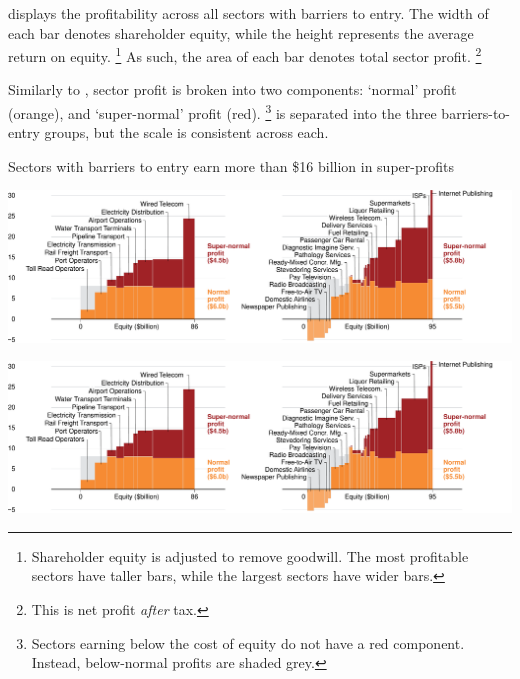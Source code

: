  displays the profitability across all sectors with barriers to entry.
The width of each bar denotes shareholder equity, while the height represents the average return on equity.%
    \footnote{Shareholder equity is adjusted to remove goodwill. The most profitable sectors have taller bars, while the largest sectors have wider bars.}
As such, the area of each bar denotes total sector profit.%
    \footnote{This is net profit \emph{after} tax.}

Similarly to , sector profit is broken into two components: `normal' profit (orange), and `super-normal' profit (red).%
    \footnote{Sectors earning below the cost of equity do not have a red component. Instead, below-normal profits are shaded grey.}
 is separated into the three barriers-to-entry groups, but the scale is consistent across each.

\begin{figureWhole}
\caption{Sectors with barriers to entry earn more than \$16 billion in super-profits\label{fig:ROE_barriers}}
 \vspace{2pt} 
\vspace{-2pt}
\includegraphics[page=1]{atlas/Barriers.pdf}

\vspace{12pt}

\vspace{-77pt}
\includegraphics[page=2]{atlas/Barriers.pdf}
\end{figureWhole}

